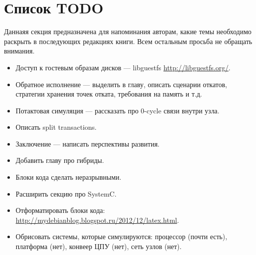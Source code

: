 \section*{Список TODO}

Даннаяя секция предназначена для напоминания авторам, какие темы необходимо раскрыть в последующих редакциях книги. Всем остальным просьба не обращать внимания.

\begin{itemize}
    \item Доступ к гостевым образам дисков --- libguestfs \url{http://libguestfs.org/}.
    \item Обратное исполнение --- выделить в главу, описать сценарии откатов, стратегии хранения точек отката, требования на память и т.д.
    \item Потактовая симуляция --- рассказать про 0-cycle связи внутри узла.
    \item Описать split transactions.
    \item Заключение --- написать перспективы развития.
	\item Добавить главу про гибриды.
	\item Блоки кода сделать неразрывными.
	\item Расширить секцию про SystemC.
	\item Отформатировать блоки кода: \url{http://mydebianblog.blogspot.ru/2012/12/latex.html}.
    \item Обрисовать системы, которые симулируются: процессор (почти есть), платформа (нет), конвеер ЦПУ (нет), сеть узлов (нет).
\end{itemize}


 


